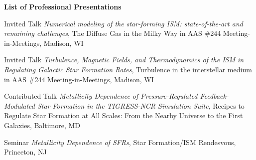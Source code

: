\documentclass[12pt]{article}
\begin{document}




\begin{itemize}[itemsep=0pt,topsep=\parskip]
\small 
\end{itemize}





\begin{itemize}[itemsep=0pt,topsep=\parskip]
\small 
\end{itemize}


\begin{center}
{\large \bf List of Professional Presentations}
\end{center}


{Invited Talk}
{\emph{Numerical modeling of the star-forming ISM: state-of-the-art and remaining challenges},
The Diffuse Gas in the Milky Way in AAS \#244 Meeting-in-Meetings,
Madison, WI}

{Invited Talk}
{\emph{Turbulence, Magnetic Fields, and Thermodynamics of the ISM in Regulating Galactic Star Formation Rates},
Turbulence in the interstellar medium in AAS \#244 Meeting-in-Meetings,
Madison, WI}

{Contributed Talk}
{\emph{Metallicity Dependence of Pressure-Regulated Feedback-Modulated Star Formation in the TIGRESS-NCR Simulation Suite},
Recipes to Regulate Star Formation at All Scales: From the Nearby Universe to the First Galaxies,
Baltimore, MD}

{Seminar}
{\emph{Metallicity Dependence of SFRs},
Star Formation/ISM Rendesvous,
Princeton, NJ}
\end{document}

